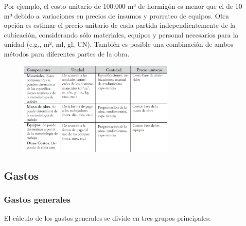 Por ejemplo, el costo unitario de 100.000 m³ de hormigón es menor que el de 10 m³ debido a variaciones en precios de insumos y prorrateo de equipos. Otra opción es estimar el precio unitario de cada partida independientemente de la cubicación, considerando sólo materiales, equipos y personal necesarios para la unidad (e.g., m², ml, gl, UN). También es posible una combinación de ambos métodos para diferentes partes de la obra.

\begin{figure}[H]
    \centering
    \includegraphics[width=0.7\textwidth]{FOTOS/pu.png}
    \label{fig:precio_unitario}
\end{figure}

\subsection{Gastos}

\subsubsection{Gastos generales}

El cálculo de los gastos generales se divide en tres grupos principales:

